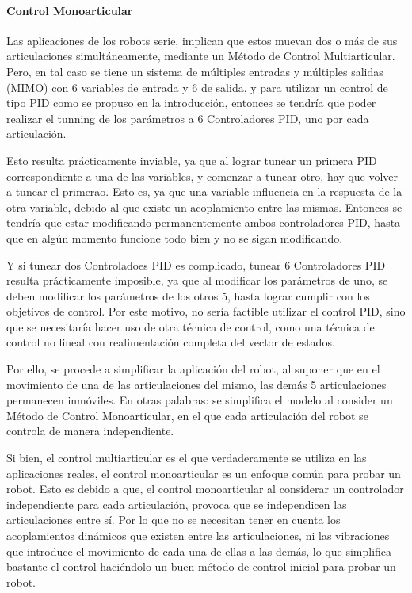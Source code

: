 \documentclass{article}
\begin{document}
\begin{sloppypar}
\paragraph{Control Monoarticular}
\label{sec:Control Monoarticular}
\hfill

Las aplicaciones de los robots serie, implican que estos muevan dos o más de sus articulaciones simultáneamente, mediante un Método de Control Multiarticular. Pero, en tal caso se tiene un sistema de múltiples entradas y múltiples salidas (MIMO) con 6 variables de entrada y 6 de salida, y para utilizar un control de tipo PID como se propuso en la introducción, entonces se tendría que poder realizar el tunning de los parámetros a 6 Controladores PID, uno por cada articulación.

Esto resulta prácticamente inviable, ya que al lograr tunear un primera PID correspondiente a una de las variables, y comenzar a tunear otro, hay que volver a tunear el primerao. Esto es, ya que una variable influencia en la respuesta de la otra variable, debido al que existe un acoplamiento entre las mismas. Entonces se tendría que estar modificando permanentemente ambos controladores PID, hasta que en algún momento funcione todo bien y no se sigan modificando.

Y si tunear dos Controladoes PID es complicado, tunear 6 Controladores PID resulta prácticamente imposible, ya que al modificar los parámetros de uno, se deben modificar los parámetros de los otros 5, hasta lograr cumplir con los objetivos de control.
Por este motivo, no sería factible utilizar el control PID, sino que se necesitaría hacer uso de otra técnica de control, como una técnica de control no lineal con realimentación completa del vector de estados.

Por ello, se procede a simplificar la aplicación del robot, al suponer que en el movimiento de una de las articulaciones del mismo, las demás 5 articulaciones permanecen inmóviles. En otras palabras: se simplifica el modelo al consider un Método de Control Monoarticular, en el que cada articulación del robot se controla de manera independiente.

Si bien, el control multiarticular es el que verdaderamente se utiliza en las aplicaciones reales, el control monoarticular es un enfoque común para probar un robot. Esto es debido a que, el control monoarticular al considerar un controlador independiente para cada articulación, provoca que se independicen las articulaciones entre sí. Por lo que no se necesitan tener en cuenta los acoplamientos dinámicos que existen entre las articulaciones, ni las vibraciones que introduce el movimiento de cada una de ellas a las demás, lo que simplifica bastante el control haciéndolo un buen método de control inicial para probar un robot.


\end{sloppypar}
\end{document}
